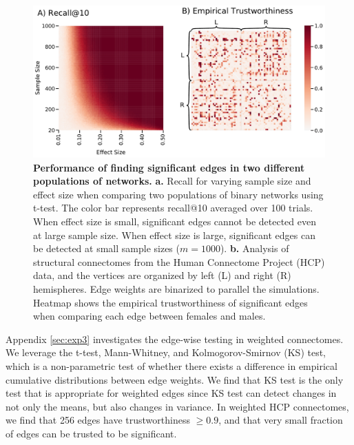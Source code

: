 \begin{figure}
    \centering
    \includegraphics[width=.75\textwidth]{figures/dnd/exp1_final}
    \caption{
    \textbf{Performance of finding significant edges in two different populations of networks.}
    \textbf{a.} Recall for varying sample size and effect size when comparing two populations of binary networks using t-test.
    The color bar represents recall@10 averaged over 100 trials. 
    When effect size is small, significant edges cannot be detected even at large sample size. When effect size is large, significant edges can be detected at small sample sizes ($m=1000$). 
    \textbf{b.} Analysis of structural connectomes from the Human Connectome Project (HCP) data, and the vertices are organized by left (L) and right (R) hemispheres. Edge weights are binarized to parallel the simulations. Heatmap shows the empirical trustworthiness of significant edges when comparing each edge between females and males.}
    \label{fig:exp1}
\end{figure}

Appendix \ref{sec:exp3} investigates the edge-wise testing in weighted connectomes. We leverage the t-test, Mann-Whitney, and Kolmogorov-Smirnov (KS) test, which is a non-parametric test of whether there exists a difference in empirical cumulative distributions between edge weights. We find that KS test is the only test that is appropriate for weighted edges since KS test can detect changes in not only the means, but also changes in variance. In weighted HCP connectomes, we find that 256 edges have trustworthiness $\geq 0.9$, and that very small fraction of edges can be trusted to be significant.




